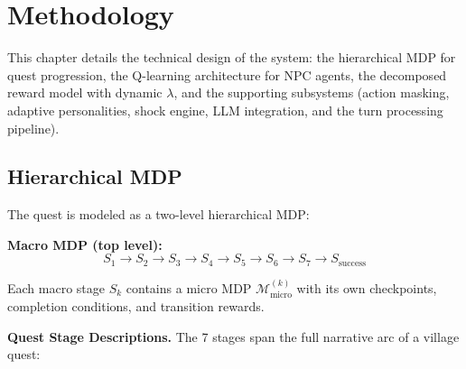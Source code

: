 \documentclass[12pt, a4paper, oneside]{report}
\begin{document}
\chapter{Methodology}
\label{chap:methodology}

This chapter details the technical design of the system: the hierarchical MDP for quest progression, the Q-learning architecture for NPC agents, the decomposed reward model with dynamic $\lambda$, and the supporting subsystems (action masking, adaptive personalities, shock engine, LLM integration, and the turn processing pipeline).

\section{Hierarchical MDP}
\label{sec:hierarchical-mdp}

The quest is modeled as a two-level hierarchical MDP:

\textbf{Macro MDP (top level):}
\begin{equation}
    S_1 \to S_2 \to S_3 \to S_4 \to S_5 \to S_6 \to S_7 \to S_{\text{success}}
\end{equation}

Each macro stage $S_k$ contains a micro MDP $\mathcal{M}_{\text{micro}}^{(k)}$ with its own checkpoints, completion conditions, and transition rewards.

\textbf{Quest Stage Descriptions.} The 7 stages span the full narrative arc of a village quest:
\end{document}
